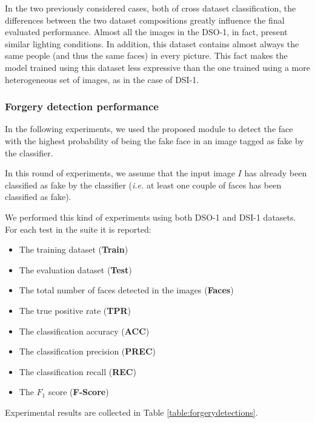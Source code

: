 In the two previously considered cases, both of cross dataset classification, the differences between the two dataset compositions greatly influence the final evaluated performance. Almost all the images in the DSO-1, in fact, present similar lighting conditions. In addition, this dataset contains almost always the same people (and thus the same faces) in every picture. This fact makes the model trained using this dataset less expressive than the one trained using a more heterogeneous set of images, as in the case of DSI-1.

\subsubsection{Forgery detection performance}

In the following experiments, we used the proposed module to detect the face with the highest probability of being the fake face in an image tagged as fake by the classifier. 

In this round of experiments, we assume that the input image $I$ has already been classified as fake by the classifier (\emph{i.e.} at least one couple of faces has been classified as fake). 

We performed this kind of experiments using both DSO-1 and DSI-1 datasets. For each test in the suite it is reported:
\begin{itemize}
\item The training dataset (\textbf{Train})
\item The evaluation dataset (\textbf{Test})
\item The total number of faces detected in the images (\textbf{Faces})
\item The true positive rate (\textbf{TPR})
\item The classification accuracy (\textbf{ACC})
\item The classification precision (\textbf{PREC})
\item The classification recall (\textbf{REC})
\item The $F_1$ score (\textbf{F-Score})
\end{itemize}

Experimental results are collected in Table \ref{table:forgerydetections}.

